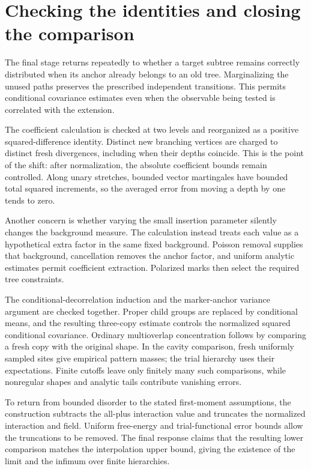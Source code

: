 \documentclass[11pt,letterpaper]{article}
\begin{document}
\section{Checking the identities and closing the comparison}
The final stage returns repeatedly to whether a target subtree remains correctly distributed when its anchor already belongs to an old tree. Marginalizing the unused paths preserves the prescribed independent transitions. This permits conditional covariance estimates even when the observable being tested is correlated with the extension.

The coefficient calculation is checked at two levels and reorganized as a positive squared-difference identity. Distinct new branching vertices are charged to distinct fresh divergences, including when their depths coincide. This is the point of the shift: after normalization, the absolute coefficient bounds remain controlled. Along unary stretches, bounded vector martingales have bounded total squared increments, so the averaged error from moving a depth by one tends to zero.

Another concern is whether varying the small insertion parameter silently changes the background measure. The calculation instead treats each value as a hypothetical extra factor in the same fixed background. Poisson removal supplies that background, cancellation removes the anchor factor, and uniform analytic estimates permit coefficient extraction. Polarized marks then select the required tree constraints.

The conditional-decorrelation induction and the marker-anchor variance argument are checked together. Proper child groups are replaced by conditional means, and the resulting three-copy estimate controls the normalized squared conditional covariance. Ordinary multioverlap concentration follows by comparing a fresh copy with the original shape. In the cavity comparison, fresh uniformly sampled sites give empirical pattern masses; the trial hierarchy uses their expectations. Finite cutoffs leave only finitely many such comparisons, while nonregular shapes and analytic tails contribute vanishing errors.

To return from bounded disorder to the stated first-moment assumptions, the construction subtracts the all-plus interaction value and truncates the normalized interaction and field. Uniform free-energy and trial-functional error bounds allow the truncations to be removed. The final response claims that the resulting lower comparison matches the interpolation upper bound, giving the existence of the limit and the infimum over finite hierarchies.
\end{document}
